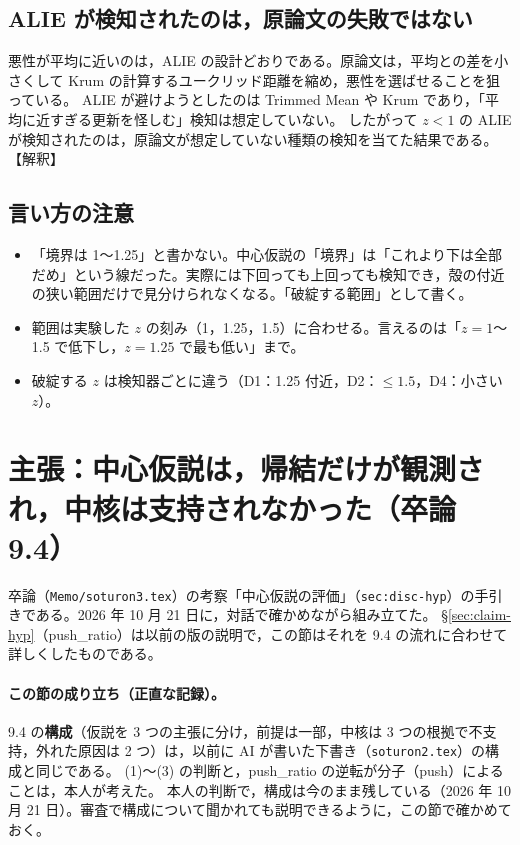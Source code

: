 \documentclass[a4j, dvipdfmx]{jsarticle}  %
\begin{document}
\subsection{ALIE が検知されたのは，原論文の失敗ではない}

悪性が平均に近いのは，ALIE の設計どおりである。原論文は，平均との差を小さくして Krum の計算するユークリッド距離を縮め，悪性を選ばせることを狙っている。
ALIE が避けようとしたのは Trimmed Mean や Krum であり，「平均に近すぎる更新を怪しむ」検知は想定していない。
したがって $z < 1$ の ALIE が検知されたのは，原論文が想定していない種類の検知を当てた結果である。【解釈】

\subsection{言い方の注意}

\begin{itemize}
  \item 「境界は 1〜1.25」と書かない。中心仮説の「境界」は「これより下は全部だめ」という線だった。実際には下回っても上回っても検知でき，殻の付近の狭い範囲だけで見分けられなくなる。「破綻する範囲」として書く。
  \item 範囲は実験した $z$ の刻み（1，1.25，1.5）に合わせる。言えるのは「$z = 1$〜1.5 で低下し，$z = 1.25$ で最も低い」まで。
  \item 破綻する $z$ は検知器ごとに違う（D1：1.25 付近，D2：$\le 1.5$，D4：小さい $z$）。
\end{itemize}

\section{主張：中心仮説は，帰結だけが観測され，中核は支持されなかった（卒論 9.4）}
\label{sec:claim-hyp4}

卒論（\texttt{Memo/soturon3.tex}）の考察「中心仮説の評価」（\texttt{sec:disc-hyp}）の手引きである。2026 年 10 月 21 日に，対話で確かめながら組み立てた。
\S\ref{sec:claim-hyp}（push\_ratio）は以前の版の説明で，この節はそれを 9.4 の流れに合わせて詳しくしたものである。

\paragraph{この節の成り立ち（正直な記録）。}
9.4 の\textbf{構成}（仮説を 3 つの主張に分け，前提は一部，中核は 3 つの根拠で不支持，外れた原因は 2 つ）は，以前に AI が書いた下書き（\texttt{soturon2.tex}）の構成と同じである。
(1)〜(3) の判断と，push\_ratio の逆転が分子（push）によることは，本人が考えた。
本人の判断で，構成は今のまま残している（2026 年 10 月 21 日）。審査で構成について聞かれても説明できるように，この節で確かめておく。
\end{document}
